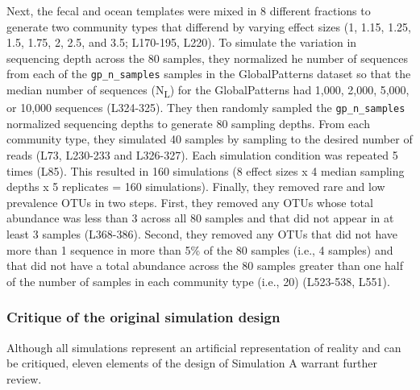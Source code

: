 \documentclass[
]{article}
\begin{document}
Next, the fecal and ocean templates were mixed in 8 different fractions
to generate two community types that differend by varying effect sizes
(1, 1.15, 1.25, 1.5, 1.75, 2, 2.5, and 3.5; L170-195, L220). To simulate
the variation in sequencing depth across the 80 samples, they normalized
he number of sequences from each of the \texttt{gp\_n\_samples} samples
in the GlobalPatterns dataset so that the median number of sequences
(N\textsubscript{L}) for the GlobalPatterns had 1,000, 2,000, 5,000, or
10,000 sequences (L324-325). They then randomly sampled the
\texttt{gp\_n\_samples} normalized sequencing depths to generate 80
sampling depths. From each community type, they simulated 40 samples by
sampling to the desired number of reads (L73, L230-233 and L326-327).
Each simulation condition was repeated 5 times (L85). This resulted in
160 simulations (8 effect sizes x 4 median sampling depths x 5
replicates = 160 simulations). Finally, they removed rare and low
prevalence OTUs in two steps. First, they removed any OTUs whose total
abundance was less than 3 across all 80 samples and that did not appear
in at least 3 samples (L368-386). Second, they removed any OTUs that did
not have more than 1 sequence in more than 5\% of the 80 samples (i.e.,
4 samples) and that did not have a total abundance across the 80 samples
greater than one half of the number of samples in each community type
(i.e., 20) (L523-538, L551).

\hypertarget{critique-of-the-original-simulation-design}{%
\subsubsection{Critique of the original simulation
design}\label{critique-of-the-original-simulation-design}}

Although all simulations represent an artificial representation of
reality and can be critiqued, eleven elements of the design of
Simulation A warrant further review.
\end{document}
